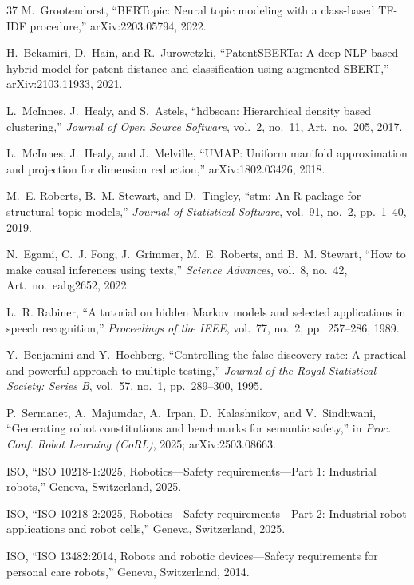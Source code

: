 \documentclass[letterpaper,9pt,conference]{ieeeconf}
\begin{document}
\begin{thebibliography}{37}
M.~Grootendorst, ``BERTopic: Neural topic modeling with a class-based TF-IDF procedure,'' arXiv:2203.05794, 2022.

H.~Bekamiri, D.~Hain, and R.~Jurowetzki, ``PatentSBERTa: A deep NLP based hybrid model for patent distance and classification using augmented SBERT,'' arXiv:2103.11933, 2021.

L.~McInnes, J.~Healy, and S.~Astels, ``hdbscan: Hierarchical density based clustering,'' \textit{Journal of Open Source Software}, vol.~2, no.~11, Art.~no.~205, 2017.

L.~McInnes, J.~Healy, and J.~Melville, ``UMAP: Uniform manifold approximation and projection for dimension reduction,'' arXiv:1802.03426, 2018.

M.~E. Roberts, B.~M. Stewart, and D.~Tingley, ``stm: An R package for structural topic models,'' \textit{Journal of Statistical Software}, vol.~91, no.~2, pp.~1--40, 2019.

N.~Egami, C.~J. Fong, J.~Grimmer, M.~E. Roberts, and B.~M. Stewart, ``How to make causal inferences using texts,'' \textit{Science Advances}, vol.~8, no.~42, Art.~no.~eabg2652, 2022.

L.~R. Rabiner, ``A tutorial on hidden Markov models and selected applications in speech recognition,'' \textit{Proceedings of the IEEE}, vol.~77, no.~2, pp.~257--286, 1989.

Y.~Benjamini and Y.~Hochberg, ``Controlling the false discovery rate: A practical and powerful approach to multiple testing,'' \textit{Journal of the Royal Statistical Society: Series B}, vol.~57, no.~1, pp.~289--300, 1995.

P.~Sermanet, A.~Majumdar, A.~Irpan, D.~Kalashnikov, and V.~Sindhwani, ``Generating robot constitutions and benchmarks for semantic safety,'' in \textit{Proc. Conf. Robot Learning (CoRL)}, 2025; arXiv:2503.08663.

ISO, ``ISO 10218-1:2025, Robotics---Safety requirements---Part 1: Industrial robots,'' Geneva, Switzerland, 2025.

ISO, ``ISO 10218-2:2025, Robotics---Safety requirements---Part 2: Industrial robot applications and robot cells,'' Geneva, Switzerland, 2025.

ISO, ``ISO 13482:2014, Robots and robotic devices---Safety requirements for personal care robots,'' Geneva, Switzerland, 2014.


\end{thebibliography}
\end{document}
